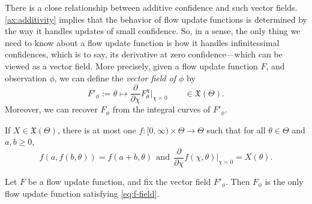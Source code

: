 There is a close relationship between additive confidence and such vector fields.
\cref{ax:additivity} 
implies that the behavior of flow update functions is determined by the
way it handles updates of small confidence.
So, in a sense, the only thing we need to know about
a flow update function is how it handles infinitessimal confidences,
which is to say, its derivative at zero confidence---which can be
viewed as a vector field.
More precisely, 
given a flow update function $F$, and observation $\phi$, 
we can define the \emph{vector field of $\phi$} by
\begin{equation}
	F'_\phi 
	:= 
	\theta \mapsto 
	\frac{\partial}{\partial \chi} F_{\theta}^{\chi} \Big|_{\chi=0}
	\qquad\in  \mathfrak X(\Theta)
	.
	\label{eq:f-field}
\end{equation}
Moreover, we can recover $F_\phi$ from the integral curves of $F'_\phi$.

\begin{fact}
	If $X \in \mathfrak X(\Theta)$, 
	there is at most one
	$f : [0,\infty) \times \Theta \to \Theta$
	such that for all $\theta \in \Theta$ and $a,b\ge 0$,
	\[
	f(a, f(b, \theta)) = f(a+b,\theta)
		~~\text{and}~~
	\frac{\partial}{\partial \chi}
	 	f(\chi,\theta)
		\Big|_{\chi{=}0}
		\!\!= X(\theta)
		.
	\]
	\label{fact:unique-integral-curves}
\end{fact}
\begin{coro}
	Let $F$ be a flow update function, and fix the vector field $F'_{\phi}$.
	Then $F_\phi$ is the only flow update function satisfying \eqref{eq:f-field}.
	\label{fact:unique-flow-for-vfield}
\end{coro}

